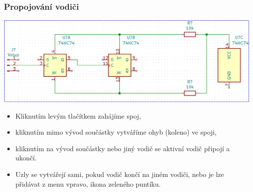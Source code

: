 \documentclass{beamer}
\begin{document}
\begin{frame}
	\frametitle{Propojování vodiči}
	
	\begin{center}
		\includegraphics[width=\textwidth]{obr/spoje02.png}
	\end{center}
	
	\small
	
	\begin{itemize}
		\item Kliknutím levým tlačítkem zahájíme spoj,
		\item kliknutím mimo vývod součástky vytváříme ohyb (koleno) ve spoji,
		\item kliknutím na vývod součástky nebo jiný vodič se aktivní vodič připojí a ukončí.
		\item Uzly se vytvářejí sami, pokud vodič končí na jiném vodiči, nebo je lze přidávat z menu vpravo, ikona zeleného puntíku.
	\end{itemize}
	
\end{frame}
\end{document}
